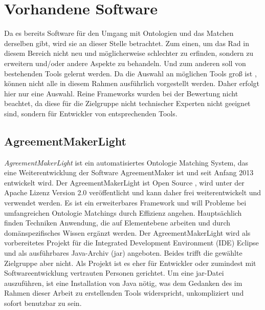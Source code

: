 		\section{Vorhandene Software}
		Da es bereits Software für den Umgang mit Ontologien und das Matchen derselben gibt, wird sie an dieser Stelle betrachtet. Zum einen, um das Rad in diesem Bereich nicht neu und möglicherweise schlechter zu erfinden, sondern zu erweitern und/oder andere Aspekte zu behandeln. Und zum anderen soll von bestehenden Tools gelernt werden. Da die Auswahl an möglichen Tools groß ist \cite{Ber14} , können nicht alle in diesem Rahmen ausführlich vorgestellt werden. Daher erfolgt hier nur eine Auswahl. Reine Frameworks wurden bei der Bewertung nicht beachtet, da diese für die Zielgruppe nicht technischer Experten nicht geeignet sind, sondern für Entwickler von entsprechenden Tools.
		
		\subsection{AgreementMakerLight}
		\textit{AgreementMakerLight} ist ein automatisiertes Ontologie Matching System,
		das eine Weiterentwicklung der Software AgreementMaker ist und seit Anfang 2013 entwickelt wird. Der AgreementMakerLight ist Open Source , wird unter der Apache Lizenz Version 2.0 veröffentlicht und kann daher frei weiterentwickelt und verwendet werden. Es ist ein erweiterbares Framework und will Probleme bei umfangreichen Ontologie Matchings durch Effizienz angehen. Hauptsächlich finden Techniken Anwendung, die auf Elementebene arbeiten und durch domänspezifisches Wissen ergänzt werden.
		Der AgreementMakerLight wird als vorbereitetes Projekt für die Integrated
		Development Environment (IDE) Eclipse und als ausführbares Java-Archiv (jar) angeboten. Beides trifft die gewählte Zielgruppe aber nicht. Als Projekt ist es eher für Entwickler oder zumindest mit Softwareentwicklung vertrauten Personen gerichtet. Um eine jar-Datei auszuführen, ist eine Installation von Java nötig, was dem Gedanken des im Rahmen dieser Arbeit zu erstellenden Tools widerspricht, unkompliziert und sofort benutzbar zu sein.
		
